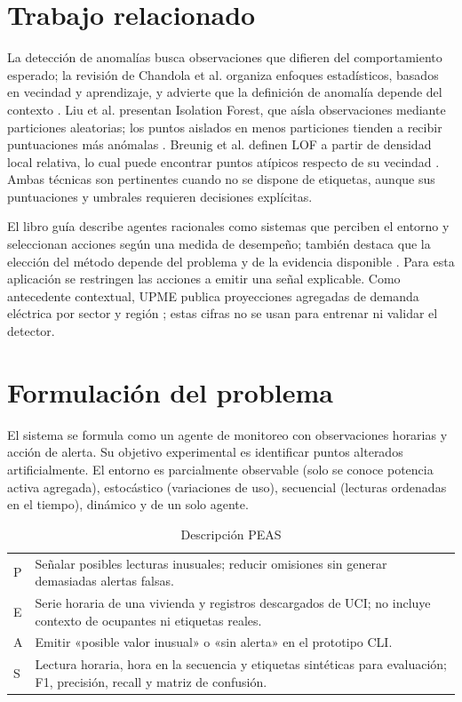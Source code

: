 \documentclass[10pt,twocolumn]{article}
\begin{document}
\section{Trabajo relacionado}
La detección de anomalías busca observaciones que difieren del comportamiento esperado; la revisión de Chandola et al. organiza enfoques estadísticos, basados en vecindad y aprendizaje, y advierte que la definición de anomalía depende del contexto \cite{chandola}. Liu et al. presentan Isolation Forest, que aísla observaciones mediante particiones aleatorias; los puntos aislados en menos particiones tienden a recibir puntuaciones más anómalas \cite{liu}. Breunig et al. definen LOF a partir de densidad local relativa, lo cual puede encontrar puntos atípicos respecto de su vecindad \cite{breunig}. Ambas técnicas son pertinentes cuando no se dispone de etiquetas, aunque sus puntuaciones y umbrales requieren decisiones explícitas.

El libro guía describe agentes racionales como sistemas que perciben el entorno y seleccionan acciones según una medida de desempeño; también destaca que la elección del método depende del problema y de la evidencia disponible \cite{russell}. Para esta aplicación se restringen las acciones a emitir una señal explicable. Como antecedente contextual, UPME publica proyecciones agregadas de demanda eléctrica por sector y región \cite{upme}; estas cifras no se usan para entrenar ni validar el detector.

\section{Formulación del problema}
El sistema se formula como un agente de monitoreo con observaciones horarias y acción de alerta. Su objetivo experimental es identificar puntos alterados artificialmente. El entorno es parcialmente observable (solo se conoce potencia activa agregada), estocástico (variaciones de uso), secuencial (lecturas ordenadas en el tiempo), dinámico y de un solo agente.

\begin{table}[h]
\centering\small
\caption{Descripción PEAS}
\begin{tabular}{p{0.72cm}p{5.4cm}}
\hline
P & Señalar posibles lecturas inusuales; reducir omisiones sin generar demasiadas alertas falsas.\\
E & Serie horaria de una vivienda y registros descargados de UCI; no incluye contexto de ocupantes ni etiquetas reales.\\
A & Emitir «posible valor inusual» o «sin alerta» en el prototipo CLI.\\
S & Lectura horaria, hora en la secuencia y etiquetas sintéticas para evaluación; F1, precisión, recall y matriz de confusión.\\
\hline
\end{tabular}\end{table}
\end{document}
